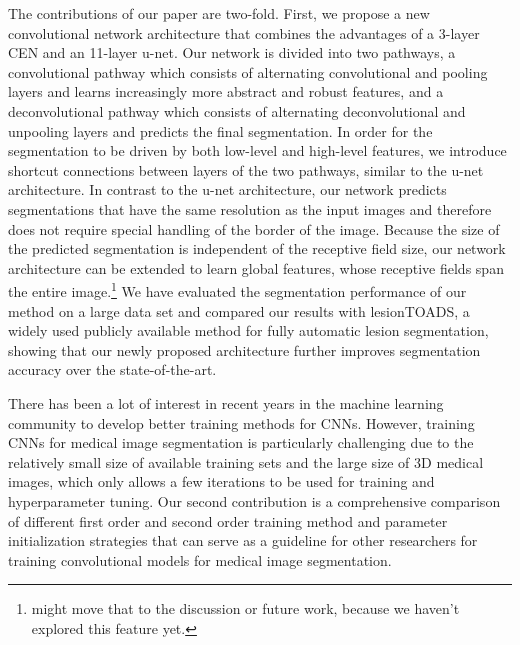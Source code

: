 The contributions of our paper are two-fold. First, we propose a new
convolutional network architecture that combines the advantages of a 3-layer CEN
and an 11-layer u-net. Our network is divided into two pathways, a convolutional
pathway which consists of alternating convolutional and pooling layers and
learns increasingly more abstract and robust features, and a deconvolutional
pathway which consists of alternating deconvolutional and unpooling layers and
predicts the final segmentation. In order for the segmentation to be driven by
both low-level and high-level features, we introduce shortcut connections
between layers of the two pathways, similar to the u-net architecture. In
contrast to the u-net architecture, our network predicts segmentations that have
the same resolution as the input images and therefore does not require special
handling of the border of the image. Because the size of the predicted
segmentation is independent of the receptive field size, our network
architecture can be extended to learn global features, whose receptive fields
span the entire image.\footnote{might move that to the discussion or future
work, because we haven't explored this feature yet.} We have evaluated the
segmentation performance of our method on a large data set and compared our
results with lesionTOADS, a widely used publicly available method for fully
automatic lesion segmentation, showing that our newly proposed architecture
further improves segmentation accuracy over the state-of-the-art.

There has been a lot of interest in recent years in the machine learning
community to develop better training methods for CNNs. However, training CNNs
for medical image segmentation is particularly challenging due to the relatively
small size of available training sets and the large size of 3D medical images,
which only allows a few iterations to be used for training and hyperparameter
tuning. Our second contribution is a comprehensive comparison of different first
order and second order training method and parameter initialization strategies
that can serve as a guideline for other researchers for training convolutional
models for medical image segmentation.



